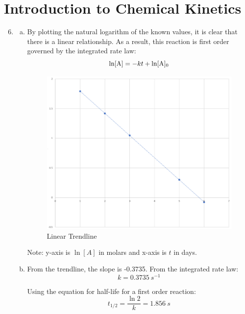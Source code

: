 \documentclass{article}
\begin{document}
\section*{ Introduction to Chemical Kinetics }

\begin{enumerate}[1.]
    \setcounter{enumi}{5}
    \item 
        \begin{enumerate}[a.]
            \item By plotting the natural logarithm of the known values, it is
                clear that there is a linear relationship. As a result, this
                reaction is first order governed by the integrated rate law:
                $$ \ln [ \ce{ A } ] = -kt + \ln [ \ce{ A } ]_{0} $$

                \begin{figure}[H]
                    \centering
                    \includegraphics[scale=0.75]{"Linear Trendline"}
                    \caption{Linear Trendline}
                \end{figure}

                Note: y-axis is $\ln [ A ]$ in molars and x-axis is $t$ in days.

            \item From the trendline, the slope is -0.3735. From the integrated
                rate law:
                $$ k = 0.3735\ \si{ s^{-1} } $$

                Using the equation for half-life for a first order reaction:
                $$ t_{1/2} = \frac{ \ln 2 }{ k } = 1.856\ \si{ s } $$


\end{enumerate}
\end{enumerate}
\end{document}
